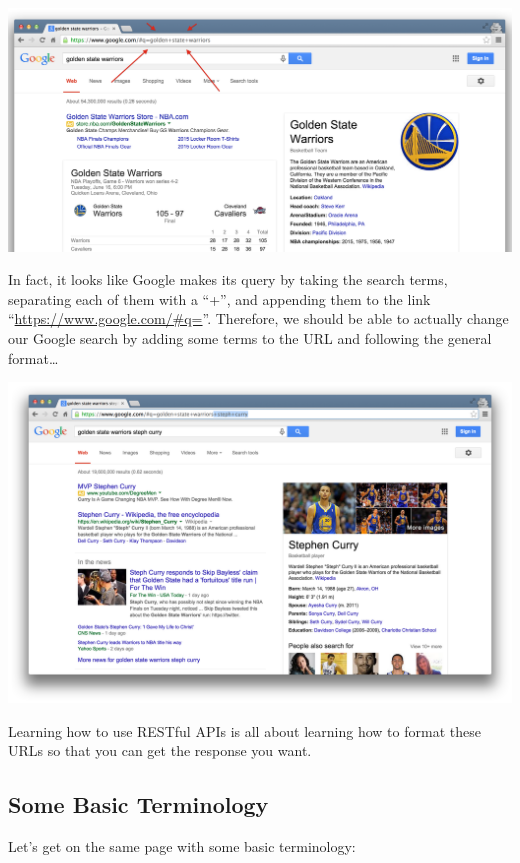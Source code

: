 \documentclass[
]{book}
\begin{document}
\begin{center}\includegraphics[width=0.7\linewidth]{img/google_link} \end{center}

In fact, it looks like Google makes its query by taking the search terms, separating each of them with a ``+'', and appending them to the link ``\url{https://www.google.com/\#q=}''. Therefore, we should be able to actually change our Google search by adding some terms to the URL and following the general format\ldots{}

\begin{center}\includegraphics[width=0.7\linewidth]{img/google_link_change} \end{center}

Learning how to use RESTful APIs is all about learning how to format these URLs so that you can get the response you want.

\hypertarget{some-basic-terminology}{%
\subsection{Some Basic Terminology}\label{some-basic-terminology}}

Let's get on the same page with some basic terminology:
\end{document}
